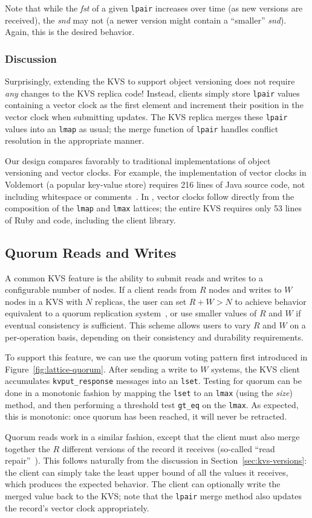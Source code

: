 Note that while the \emph{fst} of a given \texttt{lpair} increases over time (as
new versions are received), the \emph{snd} may not (a newer version might
contain a ``smaller'' \emph{snd}). Again, this is the desired behavior.

\subsubsection{Discussion}
Surprisingly, extending the KVS to support object versioning does not require
\emph{any} changes to the KVS replica code! Instead, clients simply store
\texttt{lpair} values containing a vector clock as the first element and
increment their position in the vector clock when submitting updates. The KVS
replica merges these \texttt{lpair} values into an \texttt{lmap} as usual; the
merge function of \texttt{lpair} handles conflict resolution in the appropriate
manner.

Our design compares favorably to traditional implementations of object
versioning and vector clocks. For example, the implementation of vector clocks
in Voldemort (a popular key-value store) requires 216 lines of Java source code,
not including whitespace or comments~\cite{voldemort-vector-clock}. In \lang,
vector clocks follow directly from the composition of the \texttt{lmap} and
\texttt{lmax} lattices; the entire KVS requires only 53 lines of Ruby and \lang
code, including the client library.

\subsection{Quorum Reads and Writes}
A common KVS feature is the ability to submit reads and writes to a configurable
number of nodes. If a client reads from $R$ nodes and writes to $W$ nodes in a
KVS with $N$ replicas, the user can set $R + W > N$ to achieve behavior
equivalent to a quorum replication system~\cite{Gifford1979}, or use smaller
values of $R$ and $W$ if eventual consistency is sufficient. This scheme allows
users to vary $R$ and $W$ on a per-operation basis, depending on their
consistency and durability requirements.

To support this feature, we can use the \lang quorum voting pattern first
introduced in Figure~\ref{fig:lattice-quorum}. After sending a write to $W$
systems, the KVS client accumulates \texttt{kvput\_response} messages into an
\texttt{lset}. Testing for quorum can be done in a monotonic fashion by mapping
the \texttt{lset} to an \texttt{lmax} (using the \emph{size}) method, and then
performing a threshold test \texttt{gt\_eq} on the \texttt{lmax}. As expected,
this is monotonic: once quorum has been reached, it will never be retracted.

Quorum reads work in a similar fashion, except that the client must also merge
together the $R$ different versions of the record it receives (so-called ``read
repair''~\cite{DeCandia2007}). This follows naturally from the discussion in
Section~\ref{sec:kvs-versions}: the client can simply take the least upper bound
of all the values it receives, which produces the expected behavior. The client
can optionally write the merged value back to the KVS; note that the
\texttt{lpair} merge method also updates the record's vector clock
appropriately.
